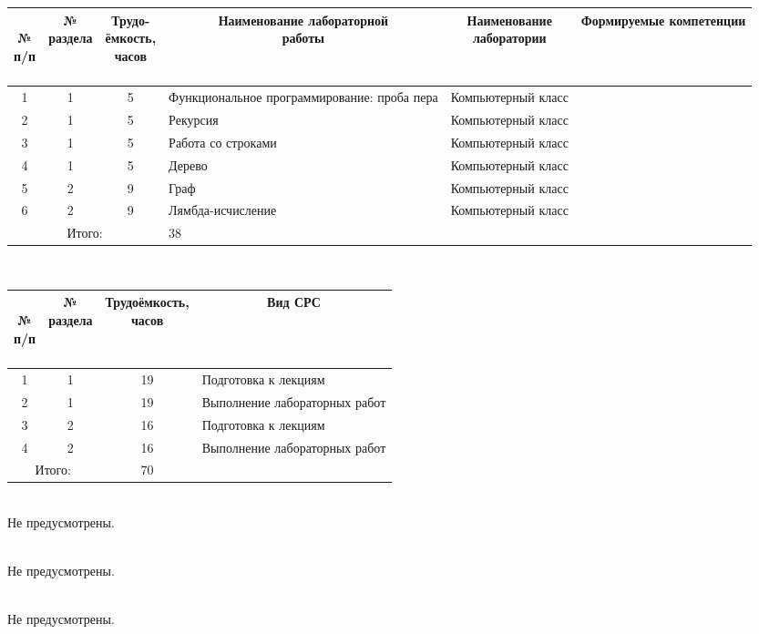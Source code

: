 \begin{center}
\begin{longtable}{|c|c|c|p{}|p{}|c|}\hline
\multicolumn{1}{|c|}{\parbox[c]{0.6cm}{\bfseries~\\№\\п/п\\~}} &
\multicolumn{1}{c|}{\parbox[c]{1.6cm}{\bfseries №\\раздела}} &
\multicolumn{1}{c|}{\parbox[c]{1.8cm}{\bfseries Трудо-\\ёмкость,\\часов}} &
\multicolumn{1}{c|}{\parbox[c]{3.5cm}{\bfseries Наименование лабораторной\\работы}} &
\multicolumn{1}{c|}{\parbox[c]{3cm}{\bfseries Наименование\\лаборатории}} &
\multicolumn{1}{c|}{\parbox{3.1cm}{\bfseries Формируемые компетенции}} \\\hline
1 & 1 & 5 & Функциональное программирование: проба пера & Компьютерный класс & \compone{} \\\hline
2 & 1 & 5 & Рекурсия & Компьютерный класс & \compone{} \\\hline
3 & 1 & 5 & Работа со строками & Компьютерный класс & \compthree{} \\\hline
4 & 1 & 5 & Дерево & Компьютерный класс & \compthree{} \\\hline
5 & 2 & 9 & Граф & Компьютерный класс & \comptwo{} \\\hline
6 & 2 & 9 & Лямбда-исчисление & Компьютерный класс & \comptwo{} \\\hline

\multicolumn{3}{|c|}{Итого:} & 38 & & \\\hline
\end{longtable}
\end{center}


\\

\begin{center}
\begin{longtable}{|c|c|c|p{}|}\hline
\multicolumn{1}{|c|}{\parbox[c]{.6cm}{\bfseries~\\№\\п/п\\~}} &
\multicolumn{1}{c|}{\parbox[c]{1.7cm}{\bfseries №\\раздела}} &
\multicolumn{1}{c|}{\parbox[c]{3.1cm}{\bfseries Трудоёмкость,\\часов}} &
\multicolumn{1}{c|}{\parbox[c]{4cm}{\bfseries Вид СРС}} \\\hline
1 & 1 & 19 & Подготовка к лекциям\\\hline
2 & 1 & 19 & Выполнение лабораторных работ\\\hline
3 & 2 & 16 & Подготовка к лекциям\\\hline
4 & 2 & 16 & Выполнение лабораторных работ\\\hline

\multicolumn{2}{|c|}{Итого:} & 70 & \\\hline
\end{longtable}
\end{center}


\\
Не предусмотрены.

\\
Не предусмотрены.

\\
Не предусмотрены.